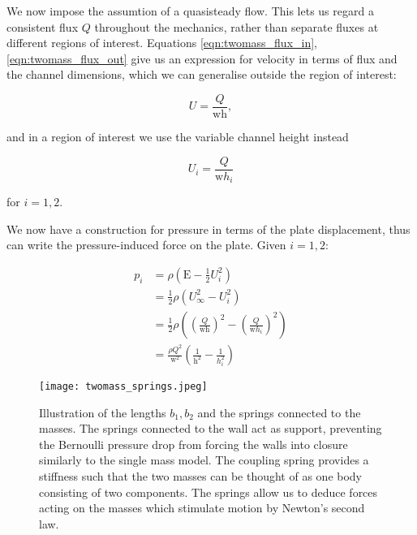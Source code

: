 \documentclass{article}
\begin{document}

We now impose the assumtion of a quasisteady flow.
This lets us regard a consistent flux $Q$ throughout the mechanics,
rather than separate fluxes at different regions of interest.
Equations \ref{eqn:twomass_flux_in}, \ref{eqn:twomass_flux_out} give us an expression for velocity in terms of flux and the channel dimensions,
which we can generalise outside the region of interest:

\begin{equation}
    U = \frac{Q}{\mathrm{wh}},
\end{equation}

\noindent and in a region of interest we use the variable channel height instead

\begin{equation}
    U_i = \frac{Q}{\mathrm{w}h_i}
\end{equation}

\noindent for \(i=1,2\).

We now have a construction for pressure in terms of the plate displacement, thus can write the pressure-induced force on the plate.
Given \(i=1,2:\)

\begin{equation}
    \begin{aligned}
        p_i &= \rho\left(\mathrm{E} - \frac{1}{2}U_i^2 \right) \\
        &= \frac{1}{2}\rho\left(U_\infty^2 - U_i^2\right) \\
        &= \frac{1}{2}\rho\left( \left(\frac{Q}{\mathrm{wh}}\right)^2 - \left(\frac{Q}{\mathrm{w}h_i}\right)^2 \right) \\
        &= \frac{\rho Q^2}{\mathrm{w}^2}\left( \frac{1}{\mathrm{h}^2} - \frac{1}{h_i^2} \right)
    \end{aligned}
    \label{eqn:twomass_pressureterm}
\end{equation}

\begin{figure}
    \centering
    \texttt{[image: twomass\_springs.jpeg]}
    \caption
    {
        Illustration of the lengths $b_1,b_2$ and the springs connected to the masses.
        The springs connected to the wall act as support,
        preventing the Bernoulli pressure drop from forcing the walls into closure similarly to the single mass model.
        The coupling spring provides a stiffness such that the two masses can be thought of as one body consisting of two components.
        The springs allow us to deduce forces acting on the masses which stimulate motion by Newton's second law. 
    }
    \label{fig:twomass_springs}
\end{figure}
\end{document}
